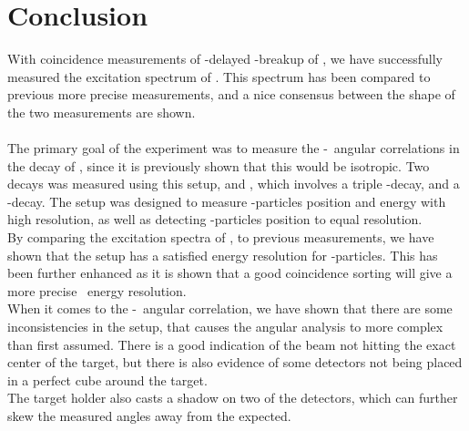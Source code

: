 \chapter{Conclusion}
With coincidence measurements of \be-delayed \al-\al breakup of \li, we have successfully measured the excitation spectrum of \ber. This spectrum has been compared to previous more precise measurements, and a nice consensus between the shape of the two measurements are shown. 
\\
\\
The primary goal of the experiment was to measure the \be-\al\ angular correlations in the decay of \li, since it is previously shown that this would be isotropic. 
Two decays was measured using this setup, \li and , which involves a triple \al-decay, and a \be-decay. The setup was designed to measure \al-particles position and energy with high resolution, as well as detecting \be-particles position to equal resolution. 
\\
By comparing the excitation spectra of \ber, to previous measurements, we have shown that the setup has a satisfied energy resolution for \al-particles. This has been further enhanced as it is shown that a good coincidence sorting will give a more precise \al\ energy resolution.\\
When it comes to the \be-\al\ angular correlation, we have shown that there are some inconsistencies in the setup, that causes the angular analysis to more complex than first assumed. There is a good indication of the beam not hitting the exact center of the target, but there is also evidence of some detectors not being placed in a perfect cube around the target. \\
The target holder also casts a shadow on two of the detectors, which can further skew the measured angles away from the expected.